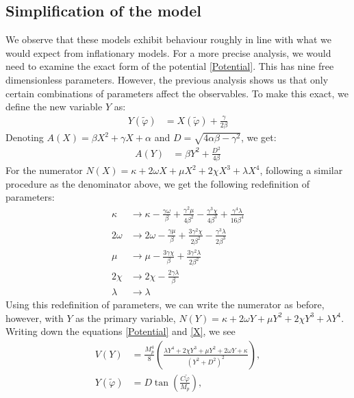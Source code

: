 \documentclass[aps,prd,reprint,preprintnumbers,showpacs,floatfix,nofootinbib,superscript address]{revtex4-2}
\begin{document}
\subsection{Simplification of the model} \label{Reduction of parameters}
We observe that these models exhibit behaviour roughly in line with what we would expect from inflationary models. For a more precise analysis, we would need to examine the exact form of the potential \cref{Potential}. This has nine free dimensionless parameters. However, the previous analysis shows us that only certain combinations of parameters affect the observables. To make this exact, we define the new variable $Y$ as:
\begin{align}
    Y(\tilde{\varphi}) &= X(\tilde{\varphi}) + \frac{\gamma}{2\beta}
\end{align}
Denoting $A(X) = \beta X^2 + \gamma X + \alpha$ and $D = \sqrt{4\alpha\beta-\gamma^2}$, we get:
\begin{align}
    A(Y) &= \beta Y^2 + \frac{D^2}{4\beta}
\end{align}
For the numerator $N(X) = \kappa + 2\omega X +\mu X^2 + 2\chi X^3 + \lambda X^4$, following a similar procedure as the denominator above, we get the following redefinition of parameters: 
\begin{subequations}
\begin{align} \label{huge redefiniton}
    \kappa &\rightarrow \kappa - \frac{\gamma\omega}{\beta} + \frac{\gamma^2\mu}{4\beta^2} - \frac{\gamma^3\chi}{4\beta^3} +\frac{\gamma^4\lambda}{16\beta^4}    \\
    2\omega &\rightarrow 2\omega - \frac{\gamma\mu}{\beta} + \frac{3\gamma^2\chi}{2\beta^2} - \frac{\gamma^3\lambda}{2\beta^3}    \\
    \mu &\rightarrow \mu - \frac{3\gamma\chi}{\beta} + \frac{3\gamma^2\lambda}{2\beta^2}  \\
    2\chi &\rightarrow 2\chi - \frac{2\gamma\lambda}{\beta}  \\
    \lambda &\rightarrow \lambda 
\end{align}    
\end{subequations}
Using this redefinition of parameters, we can write the numerator as before, however, with $Y$ as the primary variable, $N(Y) = \kappa + 2\omega Y +\mu Y^2 + 2\chi Y^3 + \lambda Y^4$. Writing down the equations \cref{Potential} and \cref{X}, we see
\begin{align}
    V(Y) &= \frac{M_p^4}{8} \left(\frac{\lambda Y^4 + 2 \chi Y^3 + \mu Y^2  + 2\omega Y + \kappa}{(Y^2 + D^2)^2} \right),  \\
    Y(\tilde{\varphi}) &= D \tan \left(\frac{C \tilde{\varphi}}{M_p} \right),
\end{align}
\end{document}

